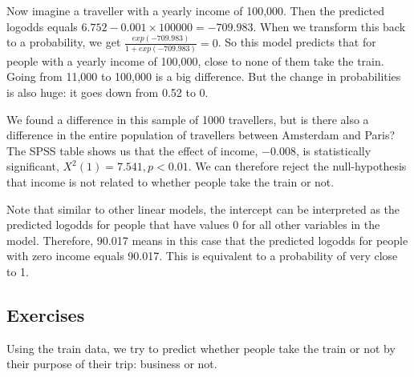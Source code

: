 \documentclass[]{book}\usepackage[]{graphicx}\usepackage[]{color}
\begin{document}
Now imagine a traveller with a yearly income of 100,000. Then the predicted logodds equals $6.752 - 0.001 \times 100000= -709.983$. When we transform this back to a probability, we get $\frac{exp(-709.983) } {1+ exp(-709.983) }= 0$. So this model predicts that for people with a yearly income of 100,000, close to none of them take the train.
Going from 11,000 to 100,000 is a big difference. But the change in probabilities is also huge: it goes down from 0.52 to 0.

We found a difference in this sample of 1000 travellers, but is there also a difference in the entire population of travellers between Amsterdam and Paris? The SPSS table shows us that the effect of income, $- 0.008$, is statistically significant, $X^2(1)=7.541, p<0.01$. We can therefore reject the null-hypothesis that income is not related to whether people take the train or not.

Note that similar to other linear models, the intercept can be interpreted as the predicted logodds for people that have values 0 for all other variables in the model. Therefore, 90.017 means in this case that the predicted logodds for people with zero income equals 90.017. This is equivalent to a probability of very close to 1.



\subsection{Exercises}

Using the train data, we try to predict whether people take the train or not by their purpose of their trip: business or not.
\end{document}
